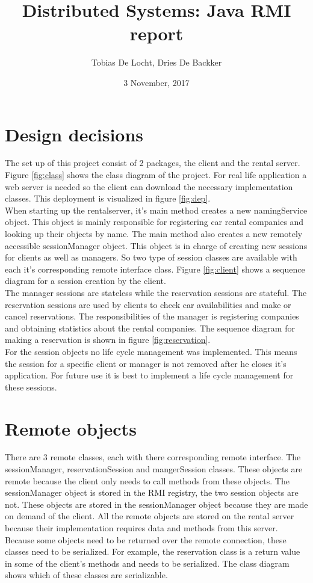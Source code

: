 \documentclass[]{article}
\title{Distributed Systems: Java RMI report}
\author{Tobias De Locht, Dries De Backker}
\date{3 November, 2017}
\begin{document}
\maketitle

\section{Design decisions}
The set up of this project consist of 2 packages, the client and the rental server. Figure \ref{fig:class} shows the class diagram of the project. For real life application a web server is needed so the client can download the necessary implementation classes. This deployment is visualized in figure \ref{fig:dep}.
\\
When starting up the rentalserver, it's main method creates a new namingService object. This object is mainly responsible for registering car rental companies and looking up their objects by name. The main method also creates a new remotely accessible sessionManager object. This object is in charge of creating new sessions for clients as well as managers. So two type of session classes are available with each it's corresponding remote interface class. Figure \ref{fig:client} shows a sequence diagram for a session creation by the client.
\\
The manager sessions are stateless while the reservation sessions are stateful. The reservation sessions are used by clients to check car availabilities and make or cancel reservations. The responsibilities of the manager is registering companies and obtaining statistics about the rental companies. The sequence diagram for making a reservation is shown in figure \ref{fig:reservation}.
\\
For the session objects no life cycle management was implemented. This means the session for a specific client or manager is not removed after he closes it's application. For future use it is best to implement a life cycle management for these sessions. 

 
\section{Remote objects}
There are 3 remote classes, each with there corresponding remote interface. The sessionManager, reservationSession and mangerSession classes. These objects are remote because the client only needs to call methods from these objects. The sessionManager object is stored in the RMI registry, the two session objects are not. These objects are stored in the sessionManager object because they are made on demand of the client. All the remote objects are stored on the rental server because their implementation requires data and methods from this server.
\\
Because some objects need to be returned over the remote connection, these classes need to be serialized. For example, the reservation class is a return value in some of the client's methods and needs to be serialized. The class diagram shows which of these classes are serializable.  
\end{document}
